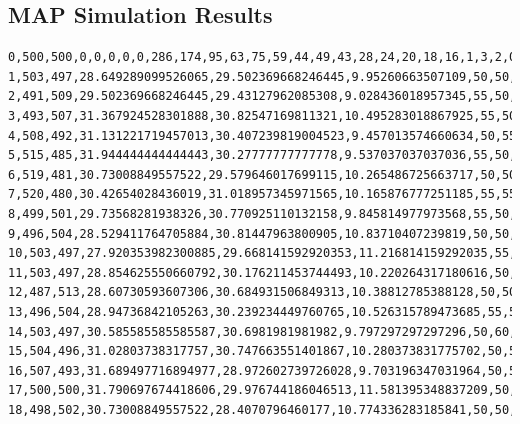 \documentclass[authoryearcitations]{UoYCSproject}
\begin{document}
\begin{landscape}
\section{MAP Simulation Results}
\pagestyle{plain}
\scriptsize
\begin{verbatim}
0,500,500,0,0,0,0,0,286,174,95,63,75,59,44,49,43,28,24,20,18,16,1,3,2,0,0
1,503,497,28.649289099526065,29.502369668246445,9.95260663507109,50,50,294,164,102,64,61,68,55,37,47,34,19,18,15,15,4,1,1,1,0
2,491,509,29.502369668246445,29.43127962085308,9.028436018957345,55,50,293,178,86,71,54,58,59,50,34,39,22,12,16,14,9,4,0,1,0
3,493,507,31.367924528301888,30.82547169811321,10.495283018867925,55,50,296,178,89,54,68,49,53,57,36,33,31,21,11,11,5,6,1,1,0
4,508,492,31.131221719457013,30.407239819004523,9.457013574660634,50,55,310,171,88,59,46,71,41,50,43,32,30,26,13,7,6,6,1,0,0
5,515,485,31.944444444444443,30.27777777777778,9.537037037037036,55,50,304,181,93,63,46,49,66,37,47,29,27,23,22,5,5,2,1,0,0
6,519,481,30.73008849557522,29.579646017699115,10.265486725663717,50,50,316,176,95,57,59,42,58,52,36,37,20,18,18,11,3,1,1,0,0
7,520,480,30.42654028436019,31.018957345971565,10.165876777251185,55,55,303,176,104,66,53,53,45,52,34,29,31,16,22,7,8,1,0,0,0
8,499,501,29.73568281938326,30.770925110132158,9.845814977973568,55,50,315,177,97,69,53,44,53,33,46,30,28,21,13,15,3,2,1,0,0
9,496,504,28.529411764705884,30.81447963800905,10.83710407239819,50,50,309,187,99,66,52,55,36,41,30,40,26,23,14,10,9,1,2,0,0
10,503,497,27.920353982300885,29.668141592920353,11.216814159292035,55,55,318,174,106,70,58,47,45,35,33,25,30,21,14,13,5,5,1,0,0
11,503,497,28.854625550660792,30.176211453744493,10.220264317180616,50,50,322,178,93,78,57,44,45,41,31,30,23,18,16,11,7,4,2,0,0
12,487,513,28.60730593607306,30.684931506849313,10.38812785388128,50,50,309,193,95,62,67,49,45,40,33,27,25,17,15,13,4,3,3,0,0
13,496,504,28.94736842105263,30.239234449760765,10.526315789473685,55,50,297,186,104,68,49,71,45,29,43,31,24,18,15,11,6,0,3,0,0
14,503,497,30.585585585585587,30.6981981981982,9.797297297297296,50,60,300,199,99,51,58,46,64,45,22,37,22,24,11,6,9,6,1,0,0
15,504,496,31.02803738317757,30.747663551401867,10.280373831775702,50,55,298,189,106,59,45,60,41,53,43,20,28,22,13,9,5,4,5,0,0
16,507,493,31.689497716894977,28.972602739726028,9.703196347031964,50,50,312,159,117,64,55,44,50,37,52,32,18,22,18,6,6,4,4,0,0
17,500,500,31.790697674418606,29.976744186046513,11.581395348837209,50,50,299,190,90,76,54,55,43,42,31,47,23,8,23,8,3,4,3,1,0
18,498,502,30.73008849557522,28.4070796460177,10.774336283185841,50,50,313,186,84,64,63,54,47,33,41,32,38,16,7,16,2,2,0,2,0

\end{verbatim}
\end{landscape}
\end{document}

